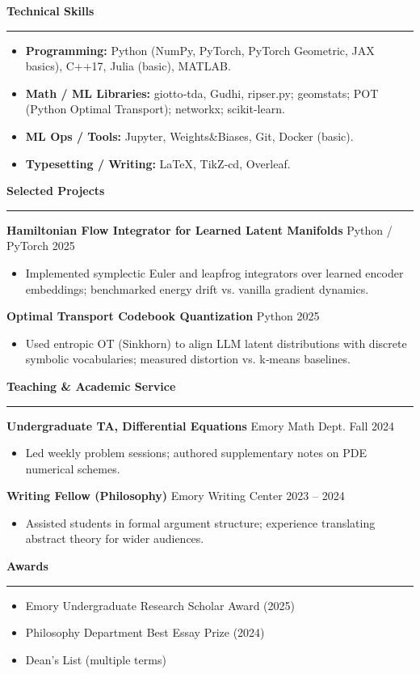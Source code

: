 \documentclass[11pt]{article}
\newcommand{\cvsection}[1]{%
  \vspace{1.25em}%
  \textbf{\large #1}%
  \vspace{0.5em}\hrule\vspace{0.6em}
}
\newcommand{\cvheading}[3]{\textbf{#1} \hfill #2 \hfill #3}
\newenvironment{cvitems}{\begin{itemize}[leftmargin=*,topsep=2pt,itemsep=2pt]}{\end{itemize}}
\begin{document}
\cvsection{Technical Skills}
\begin{cvitems}
  \item \textbf{Programming:} Python (NumPy, PyTorch, PyTorch Geometric, JAX basics), C++17, Julia (basic), MATLAB.
  \item \textbf{Math / ML Libraries:} giotto‑tda, Gudhi, ripser.py; geomstats; POT (Python Optimal Transport); networkx; scikit‑learn.
  \item \textbf{ML Ops / Tools:} Jupyter, Weights\&Biases, Git, Docker (basic).
  \item \textbf{Typesetting / Writing:} \LaTeX{}, TikZ‑cd, Overleaf.
\end{cvitems}

\cvsection{Selected Projects}
\cvheading{Hamiltonian Flow Integrator for Learned Latent Manifolds}{Python / PyTorch}{2025}
\begin{cvitems}
  \item Implemented symplectic Euler and leapfrog integrators over learned encoder embeddings; benchmarked energy drift vs. vanilla gradient dynamics.
\end{cvitems}

\cvheading{Optimal Transport Codebook Quantization}{Python}{2025}
\begin{cvitems}
  \item Used entropic OT (Sinkhorn) to align LLM latent distributions with discrete symbolic vocabularies; measured distortion vs. k‑means baselines.
\end{cvitems}

\cvsection{Teaching \& Academic Service}
\cvheading{Undergraduate TA, Differential Equations}{Emory Math Dept.}{Fall 2024}
\begin{cvitems}
  \item Led weekly problem sessions; authored supplementary notes on PDE numerical schemes.
\end{cvitems}

\cvheading{Writing Fellow (Philosophy)}{Emory Writing Center}{2023 -- 2024}
\begin{cvitems}
  \item Assisted students in formal argument structure; experience translating abstract theory for wider audiences.
\end{cvitems}

\cvsection{Awards}
\begin{cvitems}
  \item Emory Undergraduate Research Scholar Award (2025)
  \item Philosophy Department Best Essay Prize (2024)
  \item Dean’s List (multiple terms)
\end{cvitems}
\end{document}
